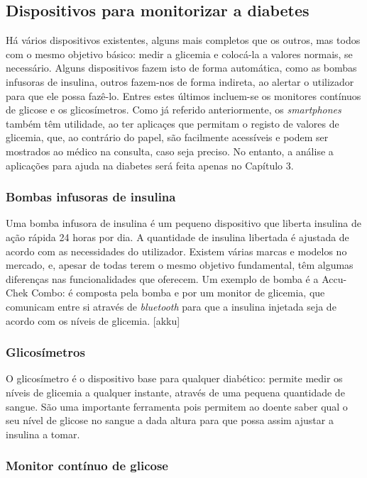 \subsection{Dispositivos para monitorizar a diabetes}

Há vários dispositivos existentes, alguns mais completos que os outros, mas todos com o mesmo objetivo básico: medir a glicemia e colocá-la a valores normais, se necessário. Alguns dispositivos fazem isto de forma automática, como as bombas infusoras de insulina, outros fazem-nos de forma indireta, ao alertar o utilizador para que ele possa fazê-lo. Entres estes últimos incluem-se os monitores contínuos de glicose e os glicosímetros. 
Como já referido anteriormente, os \textit{smartphones} também têm utilidade, ao ter aplicaçes que permitam o registo de valores de glicemia, que, ao contrário do papel, são facilmente acessíveis e podem ser mostrados ao médico na consulta, caso seja preciso. No entanto, a análise a aplicações para ajuda na diabetes será feita apenas no Capítulo 3.

\subsubsection{Bombas infusoras de insulina}

Uma bomba infusora de insulina é um pequeno dispositivo que liberta insulina de ação rápida 24 horas por dia. A quantidade de insulina libertada é ajustada de acordo com as necessidades do utilizador. Existem várias marcas e modelos no mercado, e, apesar de todas terem o mesmo objetivo fundamental, têm algumas diferenças nas funcionalidades que oferecem. Um exemplo de bomba é a Accu-Chek Combo: é composta pela bomba e por um monitor de glicemia, que comunicam entre si através de \textit{bluetooth} para que a insulina injetada seja de acordo com os níveis de glicemia. [akku]

\subsubsection{Glicosímetros}

O glicosímetro é o dispositivo base para qualquer diabético: permite medir os níveis de glicemia a qualquer instante, através de uma pequena quantidade de sangue. São uma importante ferramenta pois permitem ao doente saber qual o seu nível de glicose no sangue a dada altura para que possa assim ajustar a insulina a tomar.

\subsubsection{Monitor contínuo de glicose}

